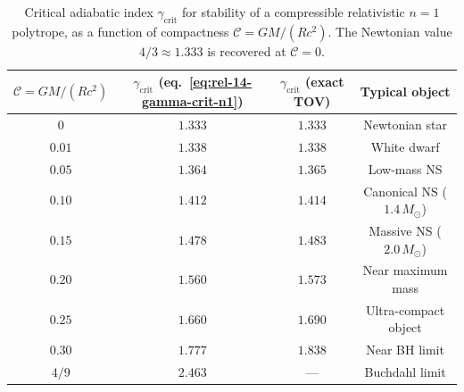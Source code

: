 \begin{table}[htbp]
\centering
\caption{Critical adiabatic index $\gamma_{\mathrm{crit}}$ for
  stability of a compressible relativistic $n = 1$ polytrope, as a
  function of compactness $\mathscr{C} = GM/(Rc^{2})$.  The Newtonian
  value $4/3 \approx 1.333$ is recovered at $\mathscr{C} = 0$.}
\label{tab:rel-gamma-crit}
\begin{tabular}{cccc}
\hline
$\mathscr{C} = GM/(Rc^{2})$ &
$\gamma_{\mathrm{crit}}$
  (eq.~\eqref{eq:rel-14-gamma-crit-n1}) &
$\gamma_{\mathrm{crit}}$ (exact TOV) &
Typical object\\
\hline
$0$      & $1.333$ & $1.333$ & Newtonian star \\
$0.01$   & $1.338$ & $1.338$ & White dwarf \\
$0.05$   & $1.364$ & $1.365$ & Low-mass NS \\
$0.10$   & $1.412$ & $1.414$ & Canonical NS ($1.4\,M_{\odot}$)\\
$0.15$   & $1.478$ & $1.483$ & Massive NS ($2.0\,M_{\odot}$)\\
$0.20$   & $1.560$ & $1.573$ & Near maximum mass \\
$0.25$   & $1.660$ & $1.690$ & Ultra-compact object \\
$0.30$   & $1.777$ & $1.838$ & Near BH limit \\
$4/9$    & $2.463$ & --- & Buchdahl limit \\
\hline
\end{tabular}
\end{table}

